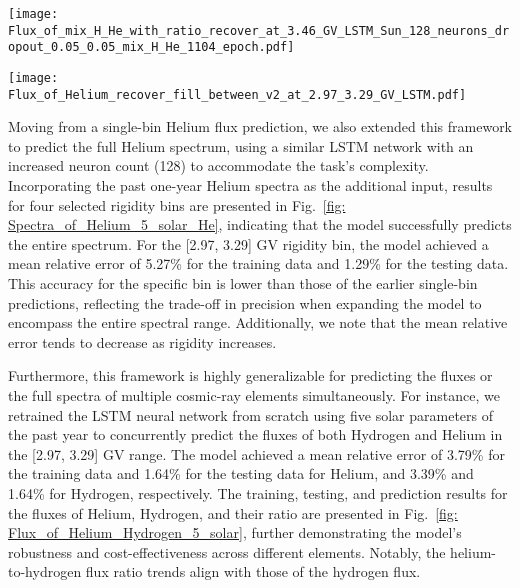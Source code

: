 \documentclass[twocolumn,,12pt]{aastex631}
\begin{document}
\begin{figure*}[tbh!]
\centering
\texttt{[image: Flux\_of\_mix\_H\_He\_with\_ratio\_recover\_at\_3.46\_GV\_LSTM\_Sun\_128\_neurons\_dropout\_0.05\_0.05\_mix\_H\_He\_1104\_epoch.pdf]}
\caption{Training, testing, and prediction results of Helium and Hydrogen flux as well as their ratio at [2.97, 3.29] GV one day ahead with five solar parameters of the past year as input. The green (yellow) dashed curve depicts the training (testing) data from AMS measurements while the blue (red) dashed curve depicts the prediction of the LSTM neural network for the training (testing) data. The chocolate dashed curve depicts the prediction of the LSTM neural network for the near future.}
\label{fig: Flux_of_Helium_Hydrogen_5_solar} 
\end{figure*}

\begin{figure*}[tbh!]
\centering
\texttt{[image: Flux\_of\_Helium\_recover\_fill\_between\_v2\_at\_2.97\_3.29\_GV\_LSTM.pdf]}
\caption{The green dashed curve depicts the AMS measurements for Helium flux at [2.97, 3.29] GV, while the chocolate-colored band shows the LSTM neural network's near-future prediction, averaged across different model configurations.}
\label{fig: Flux_of_Helium_Fill_Between} 
\end{figure*}

Moving from a single-bin Helium flux prediction, we also extended this framework to predict the full Helium spectrum, using a similar LSTM network with an increased neuron count (128) to accommodate the task’s complexity. Incorporating the past one-year Helium spectra as the additional input, results for four selected rigidity bins are presented in Fig.~\ref{fig: Spectra_of_Helium_5_solar_He}, indicating that the model successfully predicts the entire spectrum. For the [2.97, 3.29] GV rigidity bin, the model achieved a mean relative error of 5.27\% for the training data and 1.29\% for the testing data. This accuracy for the specific bin is lower than those of the earlier single-bin predictions, reflecting the trade-off in precision when expanding the model to encompass the entire spectral range. Additionally, we note that the mean relative error tends to decrease as rigidity increases.

Furthermore, this framework is highly generalizable for predicting the fluxes or the full spectra of multiple cosmic-ray elements simultaneously. For instance, we retrained the LSTM neural network from scratch using five solar parameters of the past year to concurrently predict the fluxes of both Hydrogen and Helium in the [2.97, 3.29] GV range. The model achieved a mean relative error of 3.79\% for the training data and 1.64\% for the testing data for Helium, and 3.39\% and 1.64\% for Hydrogen, respectively. The training, testing, and prediction results for the fluxes of Helium, Hydrogen, and their ratio are presented in Fig.~\ref{fig: Flux_of_Helium_Hydrogen_5_solar}, further demonstrating the model's robustness and cost-effectiveness across different elements. Notably, the helium-to-hydrogen flux ratio trends align with those of the hydrogen flux.
\end{document}
